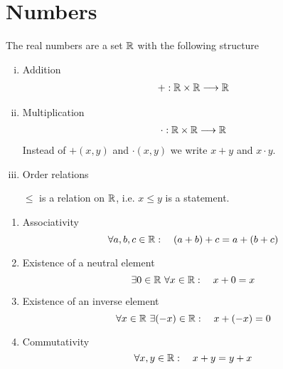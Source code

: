 \documentclass[../../script.tex]{subfiles}
\begin{document}
\section{Numbers}
\begin{defi}
The real numbers are a set $\mathbb{R}$ with the following structure
\begin{enumerate}[(i)]
	\item Addition
	\begin{align*}
		+: \mathbb{R} \times \mathbb{R} \longrightarrow \mathbb{R}
	\end{align*}
	\item Multiplication
	\begin{align*}
		\cdot: \mathbb{R} \times \mathbb{R} \longrightarrow \mathbb{R}
	\end{align*}
	Instead of $+(x, y)$ and $\cdot(x, y)$ we write $x+y$ and $x \cdot y$.
	\item Order relations
	
	$\le$ is a relation on $\mathbb{R}$, i.e. $x \le y$ is a statement.
\end{enumerate}
\end{defi}

\begin{defi}\leavevmode
\begin{enumerate}[{A}1:]
	\item Associativity
	\[
		\forall a, b, c \in \mathbb{R}: \quad (a + b) + c = a + (b + c)
	\]
	\item Existence of a neutral element
	\[
		\exists 0 \in \mathbb{R} ~\forall x \in \mathbb{R}: \quad x + 0 = x
	\]
	\item Existence of an inverse element
	\[
		\forall x \in \mathbb{R} ~\exists (-x) \in \mathbb{R}: \quad x + (-x) = 0
	\]
	\item Commutativity
	\[
		\forall x, y \in \mathbb{R}: \quad x + y = y + x
	\]
\end{enumerate}
\end{defi}
\end{document}
